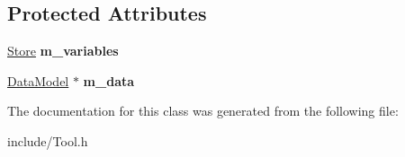 \subsection*{Protected Attributes}
\begin{DoxyCompactItemize}
\item 
\hypertarget{classTool_a208aed50c1c50212d2927b372c38763f}{\hyperlink{classStore}{Store} {\bfseries m\-\_\-variables}}\label{classTool_a208aed50c1c50212d2927b372c38763f}

\item 
\hypertarget{classTool_a98d3ffa12f1de908da9030c8718ce3f5}{\hyperlink{classDataModel}{Data\-Model} $\ast$ {\bfseries m\-\_\-data}}\label{classTool_a98d3ffa12f1de908da9030c8718ce3f5}

\end{DoxyCompactItemize}


The documentation for this class was generated from the following file\-:\begin{DoxyCompactItemize}
\item 
include/Tool.\-h\end{DoxyCompactItemize}

